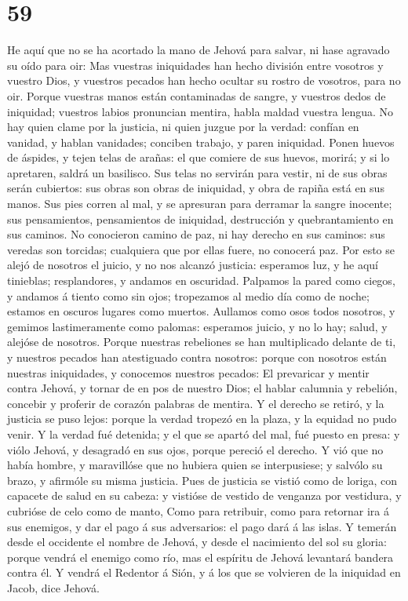 \hypertarget{section-58}{%
\section{59}\label{section-58}}

 He aquí que no se ha acortado la mano de Jehová para
salvar, ni hase agravado su oído para oir:  Mas vuestras
iniquidades han hecho división entre vosotros y vuestro Dios, y vuestros
pecados han hecho ocultar su rostro de vosotros, para no oir.
 Porque vuestras manos están contaminadas de sangre, y
vuestros dedos de iniquidad; vuestros labios pronuncian mentira, habla
maldad vuestra lengua.  No hay quien clame por la justicia,
ni quien juzgue por la verdad: confían en vanidad, y hablan vanidades;
conciben trabajo, y paren iniquidad.  Ponen huevos de
áspides, y tejen telas de arañas: el que comiere de sus huevos, morirá;
y si lo apretaren, saldrá un basilisco.  Sus telas no
servirán para vestir, ni de sus obras serán cubiertos: sus obras son
obras de iniquidad, y obra de rapiña está en sus manos.  Sus
pies corren al mal, y se apresuran para derramar la sangre inocente; sus
pensamientos, pensamientos de iniquidad, destrucción y quebrantamiento
en sus caminos.  No conocieron camino de paz, ni hay derecho
en sus caminos: sus veredas son torcidas; cualquiera que por ellas
fuere, no conocerá paz.  Por esto se alejó de nosotros el
juicio, y no nos alcanzó justicia: esperamos luz, y he aquí tinieblas;
resplandores, y andamos en oscuridad.  Palpamos la pared
como ciegos, y andamos á tiento como sin ojos; tropezamos al medio día
como de noche; estamos en oscuros lugares como muertos. 
Aullamos como osos todos nosotros, y gemimos lastimeramente como
palomas: esperamos juicio, y no lo hay; salud, y alejóse de nosotros.
 Porque nuestras rebeliones se han multiplicado delante de
ti, y nuestros pecados han atestiguado contra nosotros: porque con
nosotros están nuestras iniquidades, y conocemos nuestros pecados:
 El prevaricar y mentir contra Jehová, y tornar de en pos
de nuestro Dios; el hablar calumnia y rebelión, concebir y proferir de
corazón palabras de mentira.  Y el derecho se retiró, y la
justicia se puso lejos: porque la verdad tropezó en la plaza, y la
equidad no pudo venir.  Y la verdad fué detenida; y el que
se apartó del mal, fué puesto en presa: y viólo Jehová, y desagradó en
sus ojos, porque pereció el derecho.  Y vió que no había
hombre, y maravillóse que no hubiera quien se interpusiese; y salvólo su
brazo, y afirmóle su misma justicia.  Pues de justicia se
vistió como de loriga, con capacete de salud en su cabeza: y vistióse de
vestido de venganza por vestidura, y cubrióse de celo como de manto,
 Como para retribuir, como para retornar ira á sus
enemigos, y dar el pago á sus adversarios: el pago dará á las islas.
 Y temerán desde el occidente el nombre de Jehová, y desde
el nacimiento del sol su gloria: porque vendrá el enemigo como río, mas
el espíritu de Jehová levantará bandera contra él.  Y
vendrá el Redentor á Sión, y á los que se volvieren de la iniquidad en
Jacob, dice Jehová.

